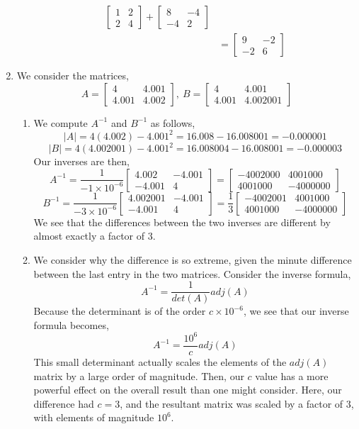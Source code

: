 \documentclass[letterpaper,10pt]{article}
\begin{document}
\begin{enumerate}
\begin{enumerate}
\begin{align*}
\begin{bmatrix}
1 & 2\\
2 & 4
\end{bmatrix}+\begin{bmatrix}
8 & -4\\
-4 & 2
\end{bmatrix}\\
&=\begin{bmatrix}
9 & -2\\
-2 & 6
\end{bmatrix}
\end{align*}
\end{enumerate}
\item We consider the matrices,
\[A=\begin{bmatrix}
4 & 4.001\\
4.001 & 4.002
\end{bmatrix},\ B=\begin{bmatrix}
4 & 4.001\\
4.001 & 4.002001
\end{bmatrix} \]
\begin{enumerate}
\item We compute $A^{-1}$ and $B^{-1}$ as follows,
\[|A|=4(4.002)-4.001^2=16.008-16.008001=-0.000001\]
\[|B|=4(4.002001)-4.001^2=16.008004-16.008001=-0.000003\]
Our inverses are then,
\[A^{-1}=\frac{1}{-1\times10^{-6}}\begin{bmatrix}
4.002 & -4.001\\-4.001 & 4
\end{bmatrix}=\begin{bmatrix}
-4002000 & 4001000\\ 4001000 & -4000000
\end{bmatrix} \]
\[B^{-1}=\frac{1}{-3\times10^{-6}}\begin{bmatrix}
4.002001 & -4.001\\-4.001 & 4
\end{bmatrix}=\frac{1}{3}\begin{bmatrix}
-4002001 & 4001000\\
4001000 & -4000000
\end{bmatrix}\]
We see that the differences between the two inverses are different by almost exactly a factor of $3$.
\item We consider why the difference is so extreme, given the minute difference between the last entry in the two matrices. Consider the inverse formula,
\[A^{-1}=\frac{1}{det(A)}adj(A)\]
Because the determinant is of the order $c\times 10^{-6}$, we see that our inverse formula becomes,
\[A^{-1}=\frac{10^6}{c}adj(A)\]
This small determinant actually scales the elements of the $adj(A)$ matrix by a large order of magnitude. Then, our $c$ value has a more powerful effect on the overall result than one might consider. Here, our difference had $c=3$, and the resultant matrix was scaled by a factor of $3$, with elements of magnitude $10^6$.

\end{enumerate}
\end{enumerate}
\end{document}
